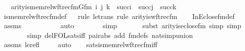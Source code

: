\begin{isabellebody}
\ \ \ {\isachardoublequoteopen}arity{\isacharparenleft}{\kern0pt}is{\isacharunderscore}{\kern0pt}memrel{\isacharunderscore}{\kern0pt}wftrec{\isacharunderscore}{\kern0pt}fm{\isacharparenleft}{\kern0pt}Gfm{\isacharcomma}{\kern0pt}\ i{\isacharcomma}{\kern0pt}\ j{\isacharcomma}{\kern0pt}\ k{\isacharparenright}{\kern0pt}{\isacharparenright}{\kern0pt}\ {\isasymle}\ succ{\isacharparenleft}{\kern0pt}i{\isacharparenright}{\kern0pt}\ {\isasymunion}\ succ{\isacharparenleft}{\kern0pt}j{\isacharparenright}{\kern0pt}\ {\isasymunion}\ succ{\isacharparenleft}{\kern0pt}k{\isacharparenright}{\kern0pt}{\isachardoublequoteclose}\isanewline
%
\isadelimproof
\isanewline
\ \ %
\endisadelimproof
%
\isatagproof
{}\isamarkupfalse%
\ is{\isacharunderscore}{\kern0pt}memrel{\isacharunderscore}{\kern0pt}wftrec{\isacharunderscore}{\kern0pt}fm{\isacharunderscore}{\kern0pt}def\isanewline
\ \ \isamarkupfalse%
{\isacharparenleft}{\kern0pt}rule\ le{\isacharunderscore}{\kern0pt}trans{\isacharcomma}{\kern0pt}\ rule\ arity{\isacharunderscore}{\kern0pt}is{\isacharunderscore}{\kern0pt}wftrec{\isacharunderscore}{\kern0pt}fm{\isacharparenright}{\kern0pt}\isanewline
\ \ \isamarkupfalse%
\ InEclose{\isacharunderscore}{\kern0pt}fm{\isacharunderscore}{\kern0pt}def\ \isanewline
\ \ \isamarkupfalse%
\ assms\isanewline
\ \ \ \ \ \ \ \ \ \isamarkupfalse%
\ auto{\isacharbrackleft}{\kern0pt}{}{\isacharbrackright}{\kern0pt}\isanewline
\ \ \ \ \ \ \isamarkupfalse%
\ simp\isanewline
\ \ \ \ \ \ \isamarkupfalse%
{\isacharparenleft}{\kern0pt}subst\ arity{\isacharunderscore}{\kern0pt}is{\isacharunderscore}{\kern0pt}eclose{\isacharunderscore}{\kern0pt}fm{\isacharcomma}{\kern0pt}\ simp{\isacharcomma}{\kern0pt}\ simp{\isacharparenright}{\kern0pt}\isanewline
\ \ \ \ \ \ \isamarkupfalse%
\ {\isacharparenleft}{\kern0pt}simp\ del{\isacharcolon}{\kern0pt}FOL{\isacharunderscore}{\kern0pt}sats{\isacharunderscore}{\kern0pt}iff\ pair{\isacharunderscore}{\kern0pt}abs\ add{\isacharcolon}{\kern0pt}\ fm{\isacharunderscore}{\kern0pt}defs\ nat{\isacharunderscore}{\kern0pt}simp{\isacharunderscore}{\kern0pt}union{\isacharparenright}{\kern0pt}\ \isanewline
\ \ \isamarkupfalse%
\ assms\ le{\isacharunderscore}{\kern0pt}refl\ \isanewline
\ \ \isamarkupfalse%
\ auto%
\endisatagproof
{\isafoldproof}%
%
\isadelimproof
\ \ \isanewline
%
\endisadelimproof
\isanewline
{}\isamarkupfalse%
\ sats{\isacharunderscore}{\kern0pt}is{\isacharunderscore}{\kern0pt}memrel{\isacharunderscore}{\kern0pt}wftrec{\isacharunderscore}{\kern0pt}fm{\isacharunderscore}{\kern0pt}iff\ {\isacharcolon}{\kern0pt}\isanewline

\end{isabellebody}
